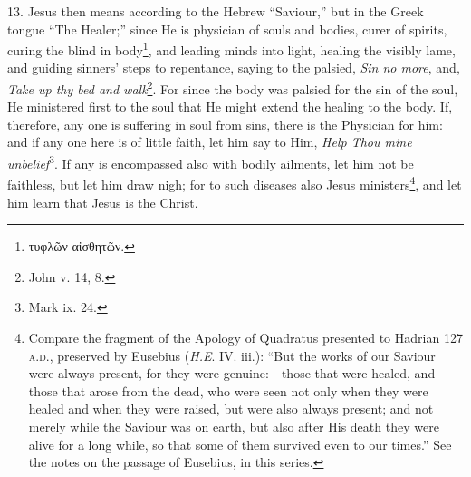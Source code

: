 13. Jesus then means according to the Hebrew “Saviour,” but in the Greek tongue “The Healer;” since He is physician of souls and bodies, curer of spirits, curing the blind in body\footnote{\textgreek{τυφλῶν αἰσθητῶν}.}, and leading minds into light, healing the visibly lame, and guiding sinners’ steps to repentance, saying to the palsied, \emph{Sin no more}, and, \emph{Take up thy bed and walk}\footnote{John v. 14, 8.}. For since the body was palsied for the sin of the soul, He ministered first to the soul that He might extend the healing to the body. If, therefore, any one is suffering in soul from sins, there is the Physician for him: and if any one here is of little faith, let him say to Him, \emph{Help Thou mine unbelief}\footnote{Mark ix. 24.}. If any is encompassed also with bodily ailments, let him not be faithless, but let him draw nigh; for to such diseases also Jesus ministers\footnote{Compare the fragment of the Apology of Quadratus presented to Hadrian 127 \textsc{a.d.}, preserved by Eusebius (\emph{H.E}. IV. iii.): “But the works of our Saviour were always present, for they were genuine:—those that were healed, and those that arose from the dead, who were seen not only when they were healed and when they were raised, but were also always present; and not merely while the Saviour was on earth, but also after His death they were alive for a long while, so that some of them survived even to our times.” See the notes on the passage of Eusebius, in this series.}, and let him learn that Jesus is the Christ.

